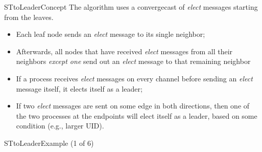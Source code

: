 \documentclass[pdf]{beamer}
\begin{document}
\begin{frame}{STtoLeader}{Concept}
    The algorithm uses a convergecast of \emph{elect} messages starting from the leaves.\\
    \begin{itemize}
        \item Each leaf node sends an \emph{elect} message to its single neighbor; \\
        \item Afterwards, all nodes that have received \emph{elect} messages from all their neighbors \emph{except one} send out an \emph{elect} message to that remaining neighbor
        \item If a process receives \emph{elect} messages on every channel before
            sending an \emph{elect} message itself, it elects itself as a leader; \\
        \item If two \emph{elect} messages are sent on some edge in both directions, then
            one of the two processes at the endpoints will elect itself as a leader, based 
            on some condition (e.g., larger UID). 
    \end{itemize}
\end{frame}

\begin{frame}{STtoLeader}{Example (1 of 6)}
    \begin{center}
    \end{center}
\end{frame}
\end{document}
